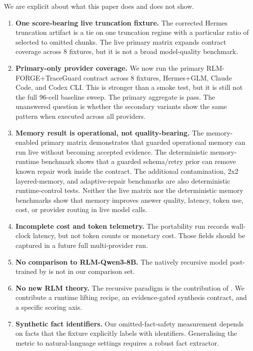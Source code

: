\documentclass[11pt,a4paper]{article}
\begin{document}
We are explicit about what this paper does and does not show.

\begin{enumerate}[leftmargin=*]
\item \textbf{One score-bearing live truncation fixture.} The corrected
Hermes truncation artifact is a tie on one truncation regime with a
particular ratio of selected to omitted chunks. The live primary matrix
expands contract coverage across 8 fixtures, but it is not a broad
model-quality benchmark.
\item \textbf{Primary-only provider coverage.} We now run the primary
RLM-FORGE+TraceGuard contract across 8 fixtures, Hermes+GLM, Claude Code,
and Codex CLI. This is stronger than a smoke test, but it is still not the
full 96-cell baseline sweep. The primary aggregate is pass. The unanswered
question is whether the secondary variants show the same pattern when executed
across all providers.
\item \textbf{Memory result is operational, not quality-bearing.} The
memory-enabled primary matrix demonstrates that guarded operational memory can
run live without becoming accepted evidence. The deterministic memory-runtime
benchmark shows that a guarded schema/retry prior can remove known repair work
inside the contract. The additional contamination, 2x2 layered-memory, and
adaptive-repair benchmarks are also deterministic runtime-control tests.
Neither the live matrix nor the deterministic memory benchmarks show that
memory improves answer quality, latency, token use, cost, or provider routing
in live model calls.
\item \textbf{Incomplete cost and token telemetry.} The portability run
records wall-clock latency, but not token counts or monetary cost. Those
fields should be captured in a future full multi-provider run.
\item \textbf{No comparison to RLM-Qwen3-8B.} The natively recursive
model post-trained by \citet{zhang2025rlm} is not in our comparison set.
\item \textbf{No new RLM theory.} The recursive paradigm is the
contribution of \citet{zhang2025rlm}. We contribute a runtime lifting
recipe, an evidence-gated synthesis contract, and a specific scoring axis.
\item \textbf{Synthetic fact identifiers.} Our omitted-fact-safety
measurement depends on facts that the fixture explicitly labels with
identifiers. Generalising the metric to natural-language settings
requires a robust fact extractor.
\end{enumerate}
\end{document}

